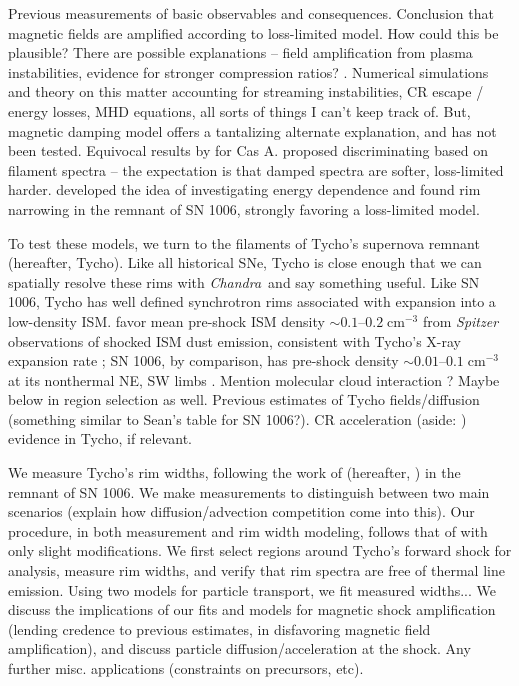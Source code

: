 \documentclass[iop, apj, numberedappendix, twocolappendix]{emulateapj}
\newcommand*{\mt}{\mathrm}
\newcommand*{\unit}[1]{\;\mt{#1}}  %
\newcommand*{\abt}{\mathord{\sim}} %
\newcommand*{\Chandra}{\textit{Chandra}\ }
\begin{document}
Previous measurements of basic observables \citep[e.g.,][]{bamba2003,
bamba2005-hist, bamba2005-vela, parizot2006} and consequences.  Conclusion that
magnetic fields are amplified according to loss-limited model.  How could this
be plausible?  There are possible explanations -- field amplification from
plasma instabilities, evidence for stronger compression ratios?
\citep{blondin2001}.  Numerical simulations and theory on this matter
accounting for streaming instabilities, CR escape / energy losses, MHD
equations, all sorts of things I can't keep track of.  But, magnetic damping
model offers a tantalizing alternate explanation, and has not been tested.
Equivocal results by \citet{araya2010} for Cas A.
\citet{rettig2012} proposed discriminating based on filament spectra -- the
expectation is that damped spectra are softer, loss-limited harder.
\citet{ressler2014} developed the idea of investigating energy dependence and
found rim narrowing in the remnant of SN 1006, strongly favoring a loss-limited
model.

To test these models, we turn to the filaments of Tycho's supernova remnant
(hereafter, Tycho).
Like all historical SNe, Tycho is close enough that we can spatially
resolve these rims with \Chandra and say something useful.  Like SN 1006, Tycho
has well defined synchrotron rims associated with expansion into a low-density
ISM.  \citet{williams2013} favor mean pre-shock ISM density $\abt 0.1$--$0.2
\unit{cm^{-3}}$ from \textit{Spitzer} observations of shocked ISM dust
emission, consistent with Tycho's X-ray expansion rate \citep{katsuda2010}; SN
1006, by comparison, has pre-shock density $\abt 0.01$--$0.1 \unit{cm^{-3}}$ at
its nonthermal NE, SW limbs \citep{acero2007}.
Mention molecular cloud interaction \citep{reynoso1999}? Maybe below in region
selection as well.
Previous estimates of Tycho fields/diffusion (something similar to Sean's table
for SN 1006?).  CR acceleration (aside: \citet{eriksen2011}) evidence in Tycho,
if relevant.

We measure Tycho's rim widths, following the work of \citet{ressler2014}
(hereafter, ) in the remnant of SN 1006.
We make measurements to distinguish between two main scenarios
(explain how diffusion/advection competition come into this).
Our procedure, in both measurement and rim width modeling, follows that of
 with only slight modifications.
We first select regions around Tycho's forward shock for analysis, measure
rim widths, and verify that rim spectra are free of thermal line emission.
Using two models for particle transport, we fit measured widths...
We discuss the implications of our fits and models for magnetic shock
amplification (lending credence to previous estimates, in disfavoring magnetic
field amplification), and discuss particle diffusion/acceleration at the shock.
Any further misc. applications (constraints on precursors, etc).
\end{document}
